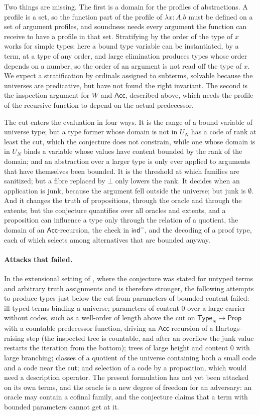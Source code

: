 \documentclass[10pt]{article}
\newcommand{\Prop}{\mathsf{Prop}}
\newcommand{\Type}{\mathsf{Type}}
\newcommand{\ind}{\mathsf{ind}}
\newcommand{\Acc}{\mathsf{Acc}}
\begin{document}
Two things are missing. The first is a domain for the profiles of
abstractions. A profile is a set, so the function part of the profile of
$\lambda x{:}A.b$ must be defined on a set of argument profiles, and
soundness needs every argument the function can receive to have a
profile in that set. Stratifying by the order of the type of $x$ works
for simple types; here a bound type variable can be instantiated, by a
term, at a type of any order, and large elimination produces types whose
order depends on a number, so the order of an argument is not read off
the type of $x$. We expect a stratification by ordinals assigned to
subterms, solvable because the universes are predicative, but have not
found the right invariant. The second is the inspection argument for $W$
and $\Acc$, described above, which needs the profile of the recursive
function to depend on the actual predecessor.


The cut enters the evaluation in four ways. It is the range of a bound
variable of universe type; but a type former whose domain is not in
$U_N$ has a code of rank at least the cut, which the conjecture does not
constrain, while one whose domain is in $U_N$ binds a variable whose
values have content bounded by the rank of the domain; and an
abstraction over a larger type is only ever applied to arguments that
have themselves been bounded. It is the threshold at which families are
sanitized; but a fibre replaced by $\bot$ only lowers the rank. It
decides when an application is junk, because the argument fell outside
the universe; but junk is $\emptyset$. And it changes the truth of
propositions, through the oracle and through the extents; but the
conjecture quantifies over all oracles and extents, and a proposition
can influence a type only through the relation of a quotient, the
domain of an $\Acc$-recursion, the check in $\ind^=$, and the decoding of
a proof type, each of which selects among alternatives that are bounded
anyway.

\paragraph{Attacks that failed.}
In the extensional setting of \cite[\S8]{paper2}, where the conjecture
was stated for untyped terms and arbitrary truth assignments and is
therefore stronger, the following attempts to produce types just below
the cut from parameters of bounded content failed: ill-typed terms
binding a universe; parameters of content $0$ over a large carrier
without codes, such as a well-order of length above the cut on
$\Type_N\to\Prop$ with a countable predecessor function, driving an
$\Acc$-recursion of a Hartogs-raising step (the inspected tree is
countable, and after an overflow the junk value restarts the iteration
from the bottom); trees of large height and content $0$ with large
branching; classes of a quotient of the universe containing both a
small code and a code near the cut; and selection of a code by a
proposition, which would need a description operator. The present
formulation has not yet been attacked on its own terms, and the oracle
is a new degree of freedom for an adversary: an oracle may contain a
cofinal family, and the conjecture claims that a term with bounded
parameters cannot get at it.
\end{document}
